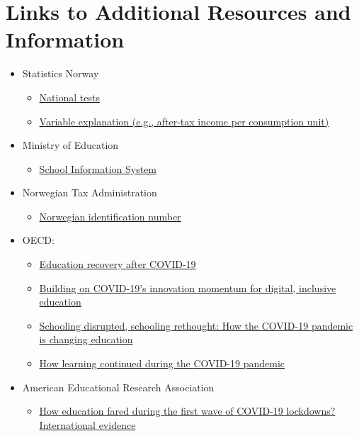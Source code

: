 \section{Links to Additional Resources and Information}

\begin{itemize}
    \item Statistics Norway
        \begin{itemize}
            \item \href{https://www.ssb.no/en/utdanning/grunnskoler/statistikk/nasjonale-prover}{National tests}
            \item \href{https://www.ssb.no/a/metadata/conceptvariable/vardok/3363/en}{Variable explanation (e.g., after-tax income per consumption unit)}
        \end{itemize}
    \item Ministry of Education
        \begin{itemize}
            \item \href{https://gsi.udir.no/}{School Information System}
        \end{itemize}
    \item Norwegian Tax Administration
        \begin{itemize}
            \item \href{https://www.skatteetaten.no/en/person/foreign/norwegian-identification-number/}{Norwegian identification number}
        \end{itemize}
    \item OECD:
        \begin{itemize}
            \item \href{https://oecdedutoday.com/education-recovery-after-covid/}{Education recovery after {COVID}-19}
            \item \href{https://doi.org/10.1787/24202496-en}{Building on {COVID}-19's innovation momentum for digital, inclusive education}
            \item \href{https://read.oecd-ilibrary.org/view/?ref=133_133390-1rtuknc0hi&title=Schooling-disrupted-schooling-rethought-How-the-Covid-19-pandemic-is-changing-education}{Schooling disrupted, schooling rethought: How the {COVID}-19 pandemic is changing education}
            \item \href{https://doi.org/10.1787/bbeca162-en}{How learning continued during the {COVID}-19 pandemic}
        \end{itemize}
    \item American Educational Research Association
        \begin{itemize}
            \item \href{https://www.aera.net/Events-Meetings/How-Education-Fared-During-the-First-Wave-of-COVID-19-Lockdowns-International-Evidence}{How education fared during the first wave of {COVID}-19 lockdowns? International evidence}
        \end{itemize}
\end{itemize}

